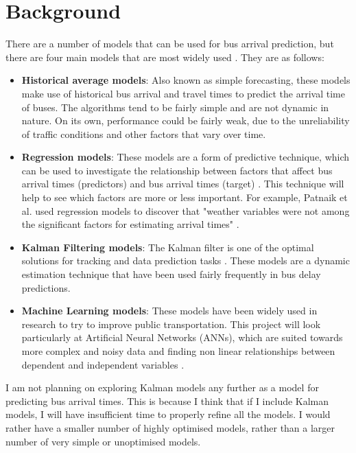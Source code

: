 \section{Background}

There are a number of models that can be used for bus arrival prediction, but there are four main models that are most widely used \cite{dynamic-gps}. They are as follows: 
\begin{itemize}
    \item \textbf{Historical average models}: Also known as simple forecasting, these models make use of historical bus arrival and travel times to predict the arrival time of buses. The algorithms tend to be fairly simple and are not dynamic in nature. On its own, performance could be fairly weak, due to the unreliability of traffic conditions and other factors that vary over time. 
    \item \textbf{Regression models}: These models are a form of predictive technique, which can be used to investigate the relationship between factors that affect bus arrival times (predictors) and bus arrival times (target) \cite{regression-techniques}. This technique will help to see which factors are more or less important. For example, Patnaik et al. used regression models to discover that "weather variables were not among the significant factors for estimating arrival times" \cite{apc-estimation}. 
    \item \textbf{Kalman Filtering models}: The Kalman filter is one of the optimal solutions for tracking and data prediction tasks \cite{kalman-mit}. These models are a dynamic estimation technique that have been used fairly frequently in bus delay predictions.
    \item \textbf{Machine Learning models}: These models have been widely used in research to try to improve public transportation. This project will look particularly at Artificial Neural Networks (ANNs), which are suited towards more complex and noisy data and finding non linear relationships between dependent and independent variables \cite{dynamic-gps}. 
\end{itemize}

I am not planning on exploring Kalman models any further as a model for predicting bus arrival times. This is because I think that if I include Kalman models, I will have insufficient time to properly refine all the models. I would rather have a smaller number of highly optimised models, rather than a larger number of very simple or unoptimised models.

